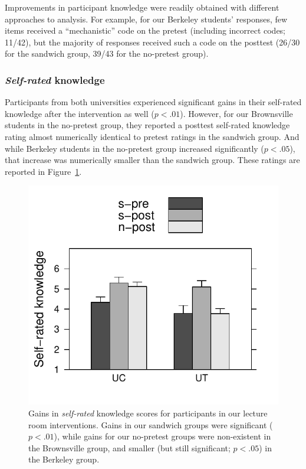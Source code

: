 Improvements in participant knowledge were readily obtained with different
approaches to analysis. For example, for our Berkeley students' responses, few
items received a “mechanistic” code on the pretest (including incorrect codes;
11/42), but the majority of responses received such a code on the posttest
(26/30 for the sandwich group, 39/43 for the no-pretest group).

\subsubsection{\emph{Self-rated} knowledge}

Participants from both universities experienced significant gains in their self-rated
knowledge after the intervention as well ($p < .01$). However, for our
Brownsville students in the no-pretest group, they reported a posttest
self-rated knowledge rating almost numerically identical to pretest ratings in
the sandwich group. And while Berkeley students in the no-pretest group
increased significantly ($p < .05$), that increase was numerically smaller than the
sandwich group. These ratings are reported in
Figure~\ref{fig:class-self-rated}.

\begin{figure}
    \centering
    \includegraphics{class-self-rated.pdf}
    \caption{Gains in \emph{self-rated} knowledge scores for participants in our
        lecture room
        interventions. Gains in our sandwich groups were significant ($p
        < .01$), while gains for our no-pretest groups were non-existent
        in the Brownsville group, and smaller (but still significant; $p < .05$)
        in the Berkeley group.}
    \label{fig:class-self-rated}
\end{figure}

